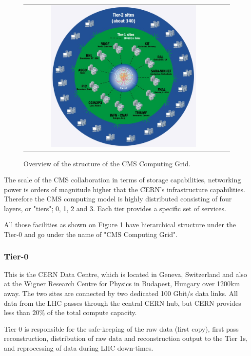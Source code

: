 \begin{figure}[tbh!]
	\centering
	\begin{tabular}{cc}
		\includegraphics[width=0.75\textwidth]{detector/pics/CMS_grid.jpg}
	\end{tabular}
	\caption{Overview of the structure of the CMS Computing Grid.}
	\label{fig:CMS_grid}
\end{figure}

The scale of the CMS collaboration in terms of storage capabilities, networking power is orders of magnitude higher that the CERN's infrastructure capabilities. Therefore the CMS computing model is highly distributed consisting of four layers, or "tiers"; 0, 1, 2 and 3. Each tier provides a specific set of services.

All those facilities as shown on Figure \ref{fig:CMS_grid} have hierarchical structure under the Tier-0 and go under the name of "CMS Computing Grid".

\subsubsection{Tier-0}

This is the CERN Data Centre, which is located in Geneva, Switzerland and also at the Wigner Research Centre for Physics in Budapest, Hungary over 1200km away. The two sites are connected by two dedicated 100 Gbit/s data links. All data from the LHC passes through the central CERN hub, but CERN provides less than $20\%$ of the total compute capacity.

Tier 0 is responsible for the safe-keeping of the raw data (first copy), first pass reconstruction, distribution of raw data and reconstruction output to the Tier 1s, and reprocessing of data during LHC down-times.

